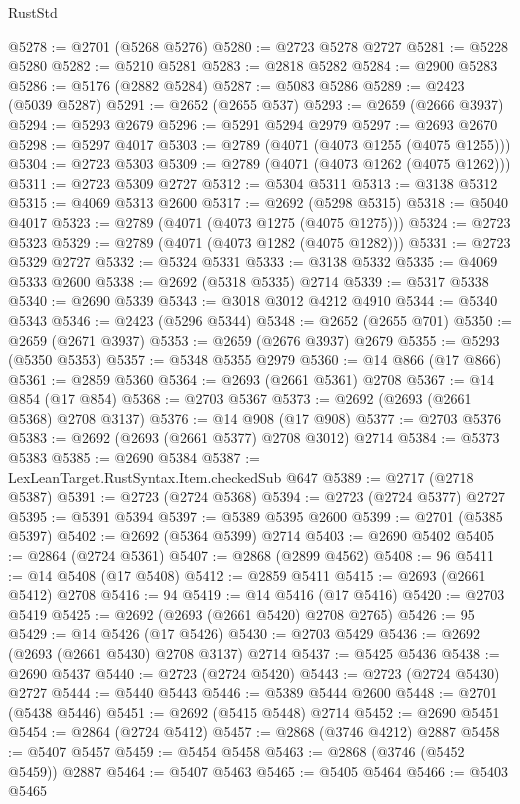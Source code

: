 \begin{lexlean}{RustStd}
\begin{coremodule}
{\begin{coremodule}
{{{{{{{{{{{{{{{{{{{{{{{{{{{{{{{{{{{{{{{@5278 := @2701 (@5268 @5276)
@5280 := @2723 @5278 @2727
@5281 := @5228 @5280
@5282 := @5210 @5281
@5283 := @2818 @5282
@5284 := @2900 @5283
@5286 := @5176 (@2882 @5284)
@5287 := @5083 @5286
@5289 := @2423 (@5039 @5287)
@5291 := @2652 (@2655 @537)
@5293 := @2659 (@2666 @3937)
@5294 := @5293 @2679
@5296 := @5291 @5294 @2979
@5297 := @2693 @2670
@5298 := @5297 @4017
@5303 := @2789 (@4071 (@4073 @1255 (@4075 @1255)))
@5304 := @2723 @5303
@5309 := @2789 (@4071 (@4073 @1262 (@4075 @1262)))
@5311 := @2723 @5309 @2727
@5312 := @5304 @5311
@5313 := @3138 @5312
@5315 := @4069 @5313 @2600
@5317 := @2692 (@5298 @5315)
@5318 := @5040 @4017
@5323 := @2789 (@4071 (@4073 @1275 (@4075 @1275)))
@5324 := @2723 @5323
@5329 := @2789 (@4071 (@4073 @1282 (@4075 @1282)))
@5331 := @2723 @5329 @2727
@5332 := @5324 @5331
@5333 := @3138 @5332
@5335 := @4069 @5333 @2600
@5338 := @2692 (@5318 @5335) @2714
@5339 := @5317 @5338
@5340 := @2690 @5339
@5343 := @3018 @3012 @4212 @4910
@5344 := @5340 @5343
@5346 := @2423 (@5296 @5344)
@5348 := @2652 (@2655 @701)
@5350 := @2659 (@2671 @3937)
@5353 := @2659 (@2676 @3937) @2679
@5355 := @5293 (@5350 @5353)
@5357 := @5348 @5355 @2979
@5360 := @14 @866 (@17 @866)
@5361 := @2859 @5360
@5364 := @2693 (@2661 @5361) @2708
@5367 := @14 @854 (@17 @854)
@5368 := @2703 @5367
@5373 := @2692 (@2693 (@2661 @5368) @2708 @3137)
@5376 := @14 @908 (@17 @908)
@5377 := @2703 @5376
@5383 := @2692 (@2693 (@2661 @5377) @2708 @3012) @2714
@5384 := @5373 @5383
@5385 := @2690 @5384
@5387 := LexLeanTarget.RustSyntax.Item.checkedSub @647
@5389 := @2717 (@2718 @5387)
@5391 := @2723 (@2724 @5368)
@5394 := @2723 (@2724 @5377) @2727
@5395 := @5391 @5394
@5397 := @5389 @5395 @2600
@5399 := @2701 (@5385 @5397)
@5402 := @2692 (@5364 @5399) @2714
@5403 := @2690 @5402
@5405 := @2864 (@2724 @5361)
@5407 := @2868 (@2899 @4562)
@5408 := 96
@5411 := @14 @5408 (@17 @5408)
@5412 := @2859 @5411
@5415 := @2693 (@2661 @5412) @2708
@5416 := 94
@5419 := @14 @5416 (@17 @5416)
@5420 := @2703 @5419
@5425 := @2692 (@2693 (@2661 @5420) @2708 @2765)
@5426 := 95
@5429 := @14 @5426 (@17 @5426)
@5430 := @2703 @5429
@5436 := @2692 (@2693 (@2661 @5430) @2708 @3137) @2714
@5437 := @5425 @5436
@5438 := @2690 @5437
@5440 := @2723 (@2724 @5420)
@5443 := @2723 (@2724 @5430) @2727
@5444 := @5440 @5443
@5446 := @5389 @5444 @2600
@5448 := @2701 (@5438 @5446)
@5451 := @2692 (@5415 @5448) @2714
@5452 := @2690 @5451
@5454 := @2864 (@2724 @5412)
@5457 := @2868 (@3746 @4212) @2887
@5458 := @5407 @5457
@5459 := @5454 @5458
@5463 := @2868 (@3746 (@5452 @5459)) @2887
@5464 := @5407 @5463
@5465 := @5405 @5464
@5466 := @5403 @5465
}}}}}}}}}}}}}}}}}}}}}}}}}}}}}}}}}}}}}}}
\end{coremodule}}
\end{coremodule}
\end{lexlean}
